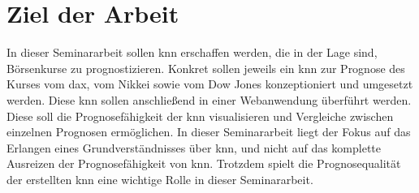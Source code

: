\section{Ziel der Arbeit}
\label{section:Ziel der Arbeit}
In dieser Seminararbeit sollen \acs{knn} erschaffen werden, die in der Lage sind, Börsenkurse zu prognostizieren. Konkret sollen jeweils ein \acs{knn} zur Prognose des Kurses vom \acs{dax}, vom Nikkei sowie vom Dow Jones konzeptioniert und umgesetzt werden. Diese \acs{knn} sollen anschließend in einer Webanwendung überführt werden. Diese soll die Prognosefähigkeit der \acs{knn} visualisieren und Vergleiche zwischen einzelnen Prognosen ermöglichen. In dieser Seminararbeit liegt der Fokus auf das Erlangen eines Grundverständnisses über \acs{knn}, und nicht auf das komplette Ausreizen der Prognosefähigkeit von \acs{knn}. Trotzdem spielt die Prognosequalität der erstellten \acs{knn} eine wichtige Rolle in dieser Seminararbeit.




